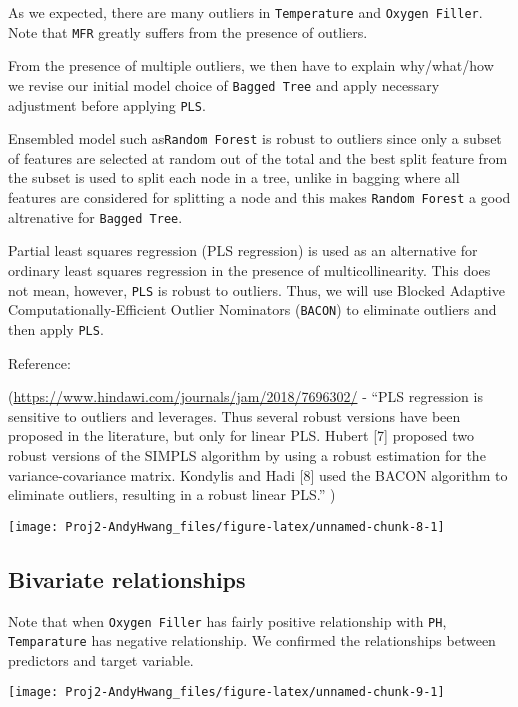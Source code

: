 \documentclass[]{report}
\begin{document}
As we expected, there are many outliers in \texttt{Temperature} and
\texttt{Oxygen\ Filler}. Note that \texttt{MFR} greatly suffers from the
presence of outliers.

From the presence of multiple outliers, we then have to explain
why/what/how we revise our initial model choice of \texttt{Bagged\ Tree}
and apply necessary adjustment before applying \texttt{PLS}.

Ensembled model such as\texttt{Random\ Forest} is robust to outliers
since only a subset of features are selected at random out of the total
and the best split feature from the subset is used to split each node in
a tree, unlike in bagging where all features are considered for
splitting a node and this makes \texttt{Random\ Forest} a good
altrenative for \texttt{Bagged\ Tree}.

Partial least squares regression (PLS regression) is used as an
alternative for ordinary least squares regression in the presence of
multicollinearity. This does not mean, however, \texttt{PLS} is robust
to outliers. Thus, we will use Blocked Adaptive
Computationally-Efficient Outlier Nominators (\texttt{BACON}) to
eliminate outliers and then apply \texttt{PLS}.

Reference:

(\url{https://www.hindawi.com/journals/jam/2018/7696302/} - ``PLS
regression is sensitive to outliers and leverages. Thus several robust
versions have been proposed in the literature, but only for linear PLS.
Hubert {[}7{]} proposed two robust versions of the SIMPLS algorithm by
using a robust estimation for the variance-covariance matrix. Kondylis
and Hadi {[}8{]} used the BACON algorithm to eliminate outliers,
resulting in a robust linear PLS.'' )

\begin{center}\texttt{[image: Proj2-AndyHwang\_files/figure-latex/unnamed-chunk-8-1]} \end{center}

\subsection{Bivariate relationships}\label{bivariate-relationships}

Note that when \texttt{Oxygen\ Filler} has fairly positive relationship
with \texttt{PH}, \texttt{Temparature} has negative relationship. We
confirmed the relationships between predictors and target variable.

\begin{center}\texttt{[image: Proj2-AndyHwang\_files/figure-latex/unnamed-chunk-9-1]} \end{center}
\end{document}
